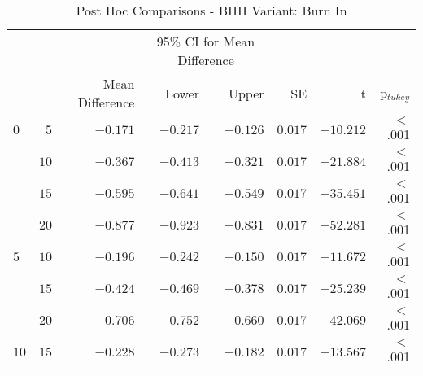 \begin{table}[htb]
	\centering
	\caption{Post Hoc Comparisons - BHH Variant: Burn In}
	\label{tab:results:burn_in:post_hoc}%
	\par\bigskip
	\resizebox{\textwidth}{!}
	{
		\begin{tabular}{lrrrrrrr}
			\toprule
			\multicolumn{1}{c}{} & \multicolumn{1}{c}{} & \multicolumn{1}{c}{} & \multicolumn{2}{c}{95\% CI for Mean Difference} & \multicolumn{1}{c}{} & \multicolumn{1}{c}{} & \multicolumn{1}{c}{}               \\
			\cline{4-5}
			$ $                  & $ $                  & Mean Difference      & Lower                                           & Upper                & SE                   & t                    & p$_{tukey}$ \\
			\cmidrule[0.4pt]{1-8}
			$0$                  & $5$                  & $-0.171$             & $-0.217$                                        & $-0.126$             & $0.017$              & $-10.212$            & $<$ .001    \\
			$ $                  & $10$                 & $-0.367$             & $-0.413$                                        & $-0.321$             & $0.017$              & $-21.884$            & $<$ .001    \\
			                     & $15$                 & $-0.595$             & $-0.641$                                        & $-0.549$             & $0.017$              & $-35.451$            & $<$ .001    \\
			                     & $20$                 & $-0.877$             & $-0.923$                                        & $-0.831$             & $0.017$              & $-52.281$            & $<$ .001    \\
			$5$                  & $10$                 & $-0.196$             & $-0.242$                                        & $-0.150$             & $0.017$              & $-11.672$            & $<$ .001    \\
			$ $                  & $15$                 & $-0.424$             & $-0.469$                                        & $-0.378$             & $0.017$              & $-25.239$            & $<$ .001    \\
			                     & $20$                 & $-0.706$             & $-0.752$                                        & $-0.660$             & $0.017$              & $-42.069$            & $<$ .001    \\
			$10$                 & $15$                 & $-0.228$             & $-0.273$                                        & $-0.182$             & $0.017$              & $-13.567$            & $<$ .001    \\

\end{tabular}}
\end{table}
